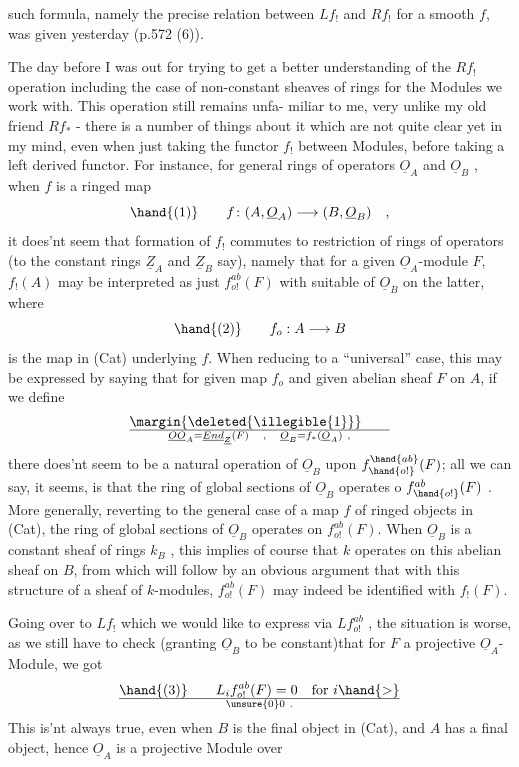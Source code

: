 
such formula, namely the precise relation between $Lf_!$ and $Rf_!$ for
a smooth $f$, was given yesterday  (p.572 (6)).

The day before\hand{,} I was out for trying to get a better understanding
of the $Rf_!$ operation\deleted{\unsure{,}} \hand{(}including the case of non-constant sheaves of
rings for the Modules we work with\hand{)}. This operation still remains unfa-%
miliar to me, very unlike my old friend $Rf_*$ - there is a number of
things about it which are not quite clear  yet in my mind,
even when just taking the functor $f_!$ between Modules, before taking a
left derived functor. For instance, for general rings of operators
$\underline{O}_A$ and $\underline{O}_B$ , when $f$ is a ringed map
\[ \hand{(1)} \qquad f\colon (A,\underline{O}_A)\longrightarrow (B,\underline{O}_B) \quad , \]
it does'nt seem that formation of $f_!$ commutes to restriction of
rings of operators (to the constant rings $\underline{Z}_A$ and $\underline{Z}_B$ say), namely that
for a given $\underline{O}_A$-module $F$, $f_!(A)$ may be interpreted as just $f^{ab}_{o!}(F)$ with
suitable  of $\underline{O}_B$ on the latter, where
\[ \hand{(2)} \qquad f_o : A\longrightarrow B \]
is the map in (Cat) underlying $f$. When reducing to a  ``universal'' case,
this may be expressed by saying that for given map $f_o$ and given abelian
sheaf $F$ on $A$, if we define
\[ \margin{\deleted{\illegible{1}}} \qquad \over{\underline{O}}{\underline{O}}_A= \underline{End}_{\underline{Z}}(F) \quad , \quad \underline{O}_B = f_*(\underline{O}_A) \ , \]
there does'nt seem to be a natural operation of $\underline{O}_B$ upon $f^{\hand{ab}}_{\hand{o!}}(F)$; all we
can say, it seems, is that the ring of global sections of $\underline{O}_B$ operates
o $f^{ab}_{\hand{o!}}(F)$ . More generally, reverting to the general case of a map $f$
of ringed objects in (Cat), the ring of global sections of $\underline{O}_B$ operates
on $f^{ab}_{o!}(F)$. When $\underline{O}_B$ is a constant sheaf of rings $k_B$ , this implies
of course that $k$ operates on this abelian sheaf on $B$, from which will
follow by an obvious argument that with this structure of a sheaf of
$k$-modules, $f^{ab}_{o!}(F)$ may indeed be identified with $f_!(F)$.

Going over to $Lf_!$ which we would like to express via $Lf^{ab}_{o!}$ , the
situation is worse, as we still have to check (granting 
$\underline{O}_B$ to be constant)that for $F$ a projective $\underline{O}_A$-Module, we got
\[ \hand{(3)} \qquad L_i f^{ab}_{o!}(F)=0 \quad \text{for } i \hand{>} \over{\unsure{0}}{0} \ . \]
This is'nt always true, even when $B$ is the final object in (Cat),
and $A$ has a final object, hence $\underline{O}_A$ is a projective Module over

